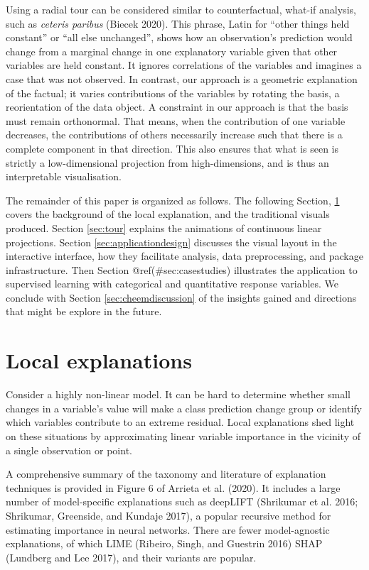 \documentclass[
]{article}
\begin{document}
Using a radial tour can be considered similar to counterfactual, what-if analysis, such as \emph{ceteris paribus} (Biecek 2020). This phrase, Latin for ``other things held constant'' or ``all else unchanged'', shows how an observation's prediction would change from a marginal change in one explanatory variable given that other variables are held constant. It ignores correlations of the variables and imagines a case that was not observed. In contrast, our approach is a geometric explanation of the factual; it varies contributions of the variables by rotating the basis, a reorientation of the data object. A constraint in our approach is that the basis must remain orthonormal. That means, when the contribution of one variable decreases, the contributions of others necessarily increase such that there is a complete component in that direction. This also ensures that what is seen is strictly a low-dimensional projection from high-dimensions, and is thus an interpretable visualisation.

The remainder of this paper is organized as follows. The following Section, \ref{sec:explanations} covers the background of the local explanation, and the traditional visuals produced. Section \ref{sec:tour} explains the animations of continuous linear projections. Section \ref{sec:applicationdesign} discusses the visual layout in the interactive interface, how they facilitate analysis, data preprocessing, and package infrastructure. Then Section @ref(\#sec:casestudies) illustrates the application to supervised learning with categorical and quantitative response variables. We conclude with Section \ref{sec:cheemdiscussion} of the insights gained and directions that might be explore in the future.

\hypertarget{sec:explanations}{%
\section{Local explanations}\label{sec:explanations}}

Consider a highly non-linear model. It can be hard to determine whether small changes in a variable's value will make a class prediction change group or identify which variables contribute to an extreme residual. Local explanations shed light on these situations by approximating linear variable importance in the vicinity of a single observation or point.

A comprehensive summary of the taxonomy and literature of explanation techniques is provided in Figure 6 of Arrieta et al. (2020). It includes a large number of model-specific explanations such as deepLIFT (Shrikumar et al. 2016; Shrikumar, Greenside, and Kundaje 2017), a popular recursive method for estimating importance in neural networks. There are fewer model-agnostic explanations, of which LIME (Ribeiro, Singh, and Guestrin 2016) SHAP (Lundberg and Lee 2017), and their variants are popular.
\end{document}
